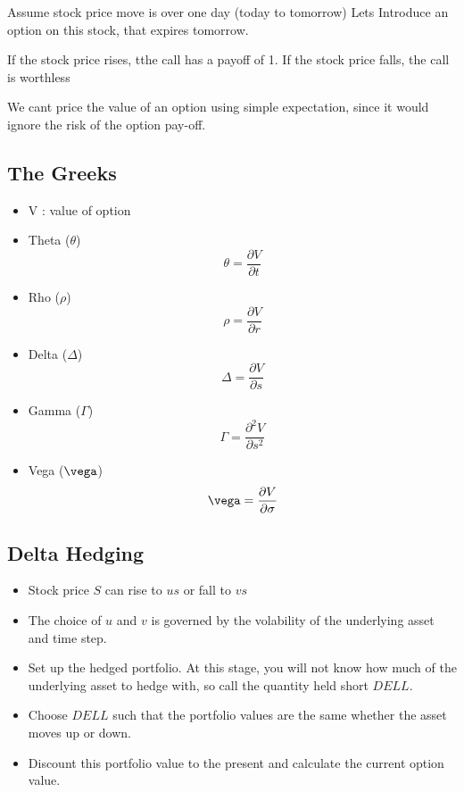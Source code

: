 Assume stock price move is over one day (today to tomorrow)
Lets Introduce an option on this stock, that expires tomorrow.

If the stock price rises, tthe call has a payoff of 1. If the stock price falls, the call is worthless

We cant price the value of an option using simple expectation, since it would ignore the risk of the option pay-off.

\subsection*{The Greeks}  %

\begin{itemize}
\item V : value of option
\item Theta ($ \theta $) \[ \theta = \frac{\partial V}{\partial t} \]
\item Rho ($ \rho $) \[ \rho = \frac{\partial V}{\partial r} \]
\item Delta ($ \Delta $) \[ \Delta = \frac{\partial V}{\partial s} \]
\item Gamma ($ \Gamma $) \[ \Gamma = \frac{\partial^2 V}{\partial s^2} \]
\item Vega ($ \vega $) \[ \vega = \frac{\partial V}{\partial \sigma} \]
\end{itemize}


\subsection*{Delta Hedging}


\begin{itemize}

\item Stock price $S$ can rise to $us$ or fall to $vs$
\item The choice of $u$ and $v$ is governed by the volability of the underlying asset and time step.
\item Set up the hedged portfolio. At this stage, you will not know how much of the underlying asset to hedge with, so call the
quantity held short $DELL$.
\item Choose $DELL$ such that the portfolio values are the same whether the asset moves up or down.
\item Discount this portfolio value to the present and calculate the current option value.
\end{itemize}

